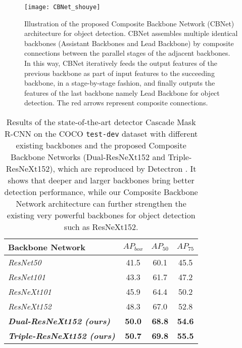 \documentclass[letterpaper]{article} \usepackage{aaai20}  \usepackage{multirow}
\begin{document}
\begin{figure}[t]
	\centering
	\texttt{[image: CBNet\_shouye]}
	\caption{Illustration of the proposed Composite Backbone Network (CBNet) architecture for object detection. CBNet assembles multiple identical backbones (Assistant Backbones and Lead Backbone) by composite connections between the parallel stages of the adjacent backbones. In this way, CBNet iteratively feeds the output features of the previous backbone as part of input features to the succeeding backbone, in a stage-by-stage fashion, and finally outputs the features of the last backbone namely Lead Backbone for object detection. The red arrows represent composite connections.}
	\label{fig:1}
\end{figure}

\begin{table}[H]
\centering \begin{tabular}{l|ccc} \toprule
		Backbone Network& $AP_{box}$ & $AP_{50}$ & $AP_{75}$ \\ \hline
		\textit{ResNet50}& 41.5 & 60.1 & 45.5\\
		\textit{ResNet101}& 43.3 & 61.7 & 47.2\\
		\textit{ResNeXt101}& 45.9 & 64.4 & 50.2 \\
		\textit{ResNeXt152}& 48.3 & 67.0 & 52.8 \\
		\hline
		\textbf{\textit{Dual-ResNeXt152 (ours)}}& \textbf{50.0} & \textbf{68.8} & \textbf{54.6} \\
		\textbf{\textit{Triple-ResNeXt152 (ours)}}& \textbf{50.7} & \textbf{69.8} & \textbf{55.5}\\
\bottomrule \end{tabular}
	\caption{Results of the state-of-the-art detector Cascade Mask R-CNN on the COCO \texttt{test-dev} dataset \cite{lin2014microsoft} with different existing backbones and the proposed Composite Backbone Networks (Dual-ResNeXt152 and Triple-ResNeXt152), which are reproduced by Detectron \cite{Detectron2018,cai18cascadercnn}. It shows that deeper and larger backbones bring better detection performance, while our Composite Backbone Network architecture can further strengthen the existing very powerful backbones for object detection such as ResNeXt152.} \label{table:backbone with cascade-mask rcnn} \end{table}
\end{document}
